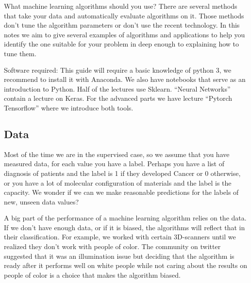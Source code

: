 \documentclass[11pt,letterpaper]{report}
\begin{document}
	
	What machine learning algorithms should you use? There are several methods that take your data and automatically evaluate algorithms on it. Those methods don't tune the algorithm parameters or don't use the recent technology. In this notes we aim to give several examples of algorithms and applications to help you identify the one suitable for your problem in deep enough to explaining how to tune them.
	
		Software required:
	This guide will require a basic knowledge of python 3, we recommend to install it with Anaconda. We also have notebooks that serve as an introduction to Python.
	Half of the lectures use  Sklearn. ``Neural Networks'' contain a lecture on Keras. For the advanced parts we have lecture ``Pytorch Tensorflow'' where we introduce both tools.
	
	\subsection{Data}
	Most of the time we are in the supervised case, so we assume that you have measured data, for each value you have a label. Perhaps you have a list of diagnosis of patients and the label is 1 if they developed Cancer or 0 otherwise, or you have a lot of molecular configuration of materials and the label is the capacity. We wonder if we  can we make reasonable predictions for the labels of new, unseen data values?
	
	 A big part of the performance of a machine learning algorithm relies on the data. If we don't have enough data, or if it is biased, the algorithms will reflect that in their classification. For example, we worked with certain 3D-scanners until we realized they don't work with people of color. The community on twitter suggested that it was an illumination issue but deciding that the algorithm is ready after it performs well on white people while not caring about the results on people of color is a choice that makes the algorithm biased.
	 
\end{document}
